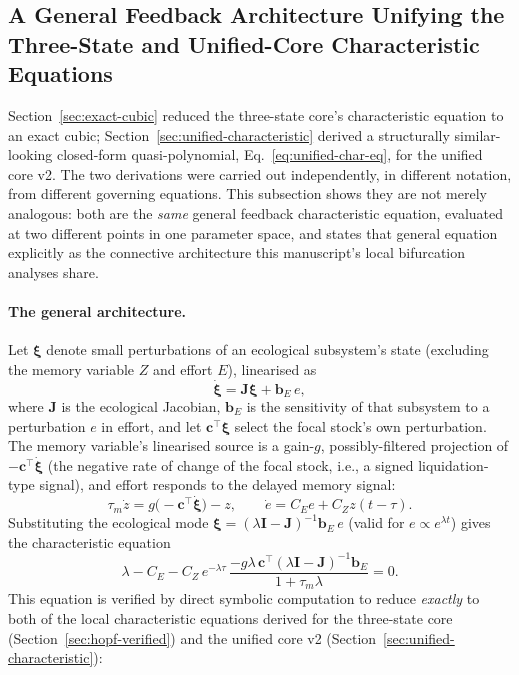 \documentclass[twocolumn,10pt]{article}
\begin{document}
\subsection{A General Feedback Architecture Unifying the Three-State and Unified-Core Characteristic Equations}
\label{sec:general-feedback}
Section~\ref{sec:exact-cubic} reduced the three-state core's characteristic equation to an exact cubic; Section~\ref{sec:unified-characteristic} derived a structurally similar-looking closed-form quasi-polynomial, Eq.~\eqref{eq:unified-char-eq}, for the unified core v2. The two derivations were carried out independently, in different notation, from different governing equations. This subsection shows they are not merely analogous: both are the \emph{same} general feedback characteristic equation, evaluated at two different points in one parameter space, and states that general equation explicitly as the connective architecture this manuscript's local bifurcation analyses share.

\paragraph{The general architecture.} Let $\boldsymbol\xi$ denote small perturbations of an ecological subsystem's state (excluding the memory variable $Z$ and effort $E$), linearised as
\[
\dot{\boldsymbol\xi} = \mathbf J\boldsymbol\xi + \mathbf b_E\,e,
\]
where $\mathbf J$ is the ecological Jacobian, $\mathbf b_E$ is the sensitivity of that subsystem to a perturbation $e$ in effort, and let $\mathbf c^\top\boldsymbol\xi$ select the focal stock's own perturbation. The memory variable's linearised source is a gain-$g$, possibly-filtered projection of $-\mathbf c^\top\dot{\boldsymbol\xi}$ (the negative rate of change of the focal stock, i.e., a signed liquidation-type signal), and effort responds to the delayed memory signal:
\[
\tau_m\dot z = g\bigl(-\mathbf c^\top\dot{\boldsymbol\xi}\bigr) - z, \qquad \dot e = C_E e + C_Z z(t-\tau).
\]
Substituting the ecological mode $\boldsymbol\xi=(\lambda\mathbf I-\mathbf J)^{-1}\mathbf b_E\,e$ (valid for $e\propto e^{\lambda t}$) gives the characteristic equation
\begin{equation}
\boxed{\ \lambda - C_E - C_Z\,e^{-\lambda\tau}\,\frac{-g\lambda\,\mathbf c^\top(\lambda\mathbf I-\mathbf J)^{-1}\mathbf b_E}{1+\tau_m\lambda} = 0.\ }
\label{eq:general-feedback}
\end{equation}
This equation is verified by direct symbolic computation to reduce \emph{exactly} to both of the local characteristic equations derived for the three-state core (Section~\ref{sec:hopf-verified}) and the unified core v2 (Section~\ref{sec:unified-characteristic}):
\end{document}
